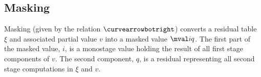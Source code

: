 \begin{abstrsyn}
\subsection{Masking}
\label{sec:masking}


Masking (given by the relation $\vsplito$) converts a residual table $\xi$
and associated partial value $v$ into a masked value $\mval i q$.
The first part of the masked value, $i$, is a monostage value holding
the result of all first stage components of $v$.  The second
component, $q$, is a residual representing all second stage
computations in $\xi$ and $v$.



\end{abstrsyn}
